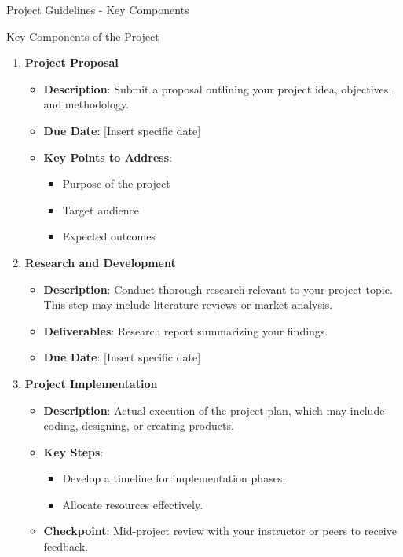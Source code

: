 \documentclass[aspectratio=169]{beamer}
\begin{document}
\begin{frame}[fragile]{Project Guidelines - Key Components}
    \begin{block}{Key Components of the Project}
        \begin{enumerate}
            \item \textbf{Project Proposal}
                \begin{itemize}
                    \item \textbf{Description}: Submit a proposal outlining your project idea, objectives, and methodology.
                    \item \textbf{Due Date}: [Insert specific date]
                    \item \textbf{Key Points to Address}:
                        \begin{itemize}
                            \item Purpose of the project
                            \item Target audience
                            \item Expected outcomes
                        \end{itemize}
                \end{itemize}
            \item \textbf{Research and Development}
                \begin{itemize}
                    \item \textbf{Description}: Conduct thorough research relevant to your project topic. This step may include literature reviews or market analysis.
                    \item \textbf{Deliverables}: Research report summarizing your findings.
                    \item \textbf{Due Date}: [Insert specific date]
                \end{itemize}
            \item \textbf{Project Implementation}
                \begin{itemize}
                    \item \textbf{Description}: Actual execution of the project plan, which may include coding, designing, or creating products.
                    \item \textbf{Key Steps}:
                        \begin{itemize}
                            \item Develop a timeline for implementation phases.
                            \item Allocate resources effectively.
                        \end{itemize}
                    \item \textbf{Checkpoint}: Mid-project review with your instructor or peers to receive feedback.
                \end{itemize}
        \end{enumerate}
    \end{block}
\end{frame}
\end{document}
